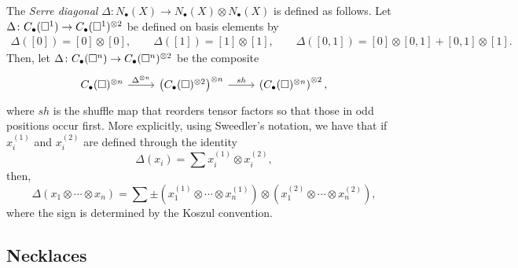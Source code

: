 The \textit{Serre diagonal} $\Delta \colon N_\bullet(X) \to N_\bullet(X) \otimes N_\bullet(X)$ is defined as follows. Let $\Delta \colon C_\bullet(\square^1) \to C_\bullet(\square^1)^{\otimes 2}$ be defined on basis elements by	
\begin{gather*}	
\Delta([0]) = [0] \otimes [0], \qquad 
\Delta([1]) = [1] \otimes [1], \qquad
\Delta([0, 1]) = [0] \otimes [0, 1] + [0, 1] \otimes [1].	
\end{gather*}	
Then, let
$\Delta \colon C_\bullet(\square^n) \to C_\bullet(\square^n)^{\otimes 2}$
be the composite
\begin{equation*}
\begin{tikzcd}
\chains(\square)^{\otimes n} \arrow[r, "\Delta^{\otimes n}"] & \left( \chains(\square)^{\otimes 2}  \right)^{\otimes n} \arrow[r, "sh"] & \left( \chains(\square)^{\otimes n} \right)^{\otimes 2},
\end{tikzcd}
\end{equation*}
where $sh$ is the shuffle map that reorders tensor factors so that those in odd positions occur first. More explicitly, using Sweedler's notation, we have that if $x_i^{(1)}$ and $x_i^{(2)}$ are defined through the identity
\begin{equation*}	
\Delta(x_i) = \sum x_i^{(1)} \otimes x_i^{(2)},
\end{equation*}	
then,
\begin{equation} \label{E: Delta}	
\Delta (x_1 \otimes \cdots \otimes x_n) = 	
\sum \pm \left( x_1^{(1)} \otimes \cdots \otimes x_n^{(1)} \right) \otimes 	
\left( x_1^{(2)} \otimes \cdots \otimes x_n^{(2)} \right),
\end{equation}	
where the sign is determined by the Koszul convention.

\subsection{Necklaces}